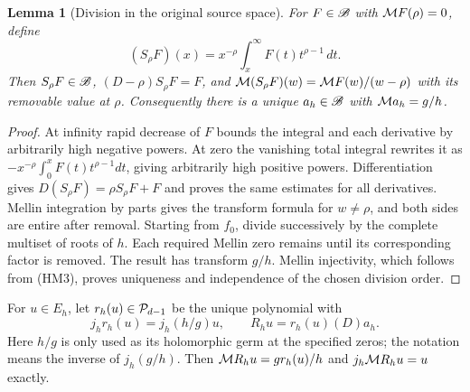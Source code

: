 \documentclass[11pt]{article}
\newtheorem{lemma}[theorem]{Lemma}
\begin{document}
\begin{lemma}[Division in the original source space]
For $F\in\mathscr B$ with $\mathcal M F(\rho)=0$, define
\[
 (S_\rho F)(x)=x^{-\rho}\int_x^\infty F(t)t^{\rho-1}\,dt.
\]
Then $S_\rho F\in\mathscr B$,
$(D-\rho)S_\rho F=F$, and
$\mathcal M(S_\rho F)(w)=\mathcal M F(w)/(w-\rho)$ with its removable value at $\rho$.
Consequently there is a unique $a_h\in\mathscr B$ with $\mathcal M a_h=g/h$.
\end{lemma}
\begin{proof}
At infinity rapid decrease of $F$ bounds the integral and each derivative
by arbitrarily high negative powers. At zero the vanishing total integral
rewrites it as $-x^{-\rho}\int_0^xF(t)t^{\rho-1}dt$, giving arbitrarily
high positive powers. Differentiation gives
$D(S_\rho F)=\rho S_\rho F+F$ and proves the same estimates for all
derivatives. Mellin integration by parts gives the transform formula for
$w\ne\rho$, and both sides are entire after removal. Starting from
$f_0$, divide successively by the complete multiset of roots of $h$.
Each required Mellin zero remains until its corresponding factor is
removed. The result has transform $g/h$. Mellin injectivity, which
follows from (HM3), proves uniqueness and independence of the chosen
division order.
\end{proof}

For $u\in E_h$, let $r_h(u)\in\mathcal P_{d-1}$ be the unique polynomial with
\begin{equation}\tag{HM5}
 j_h r_h(u)=j_h(h/g)u,
 \qquad R_hu=r_h(u)(D)a_h.
\end{equation}
Here $h/g$ is only used as its holomorphic germ at the specified zeros;
the notation means the inverse of $j_h(g/h)$. Then
$\mathcal M R_hu=g r_h(u)/h$ and $j_h\mathcal M R_hu=u$ exactly.
\end{document}
